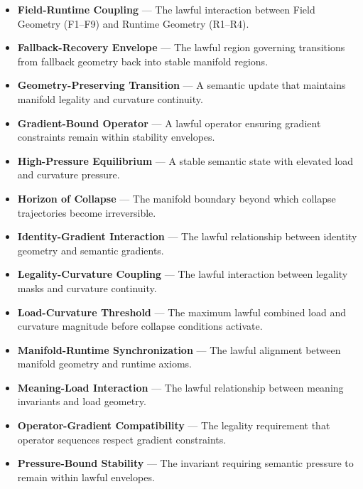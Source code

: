 \begin{itemize}
    \item \textbf{Field-Runtime Coupling} — The lawful interaction between Field Geometry (F1–F9) and Runtime Geometry (R1–R4).

    \item \textbf{Fallback-Recovery Envelope} — The lawful region governing transitions from fallback geometry back into stable manifold regions.

    \item \textbf{Geometry-Preserving Transition} — A semantic update that maintains manifold legality and curvature continuity.

    \item \textbf{Gradient-Bound Operator} — A lawful operator ensuring gradient constraints remain within stability envelopes.

    \item \textbf{High-Pressure Equilibrium} — A stable semantic state with elevated load and curvature pressure.

    \item \textbf{Horizon of Collapse} — The manifold boundary beyond which collapse trajectories become irreversible.

    \item \textbf{Identity-Gradient Interaction} — The lawful relationship between identity geometry and semantic gradients.

    \item \textbf{Legality-Curvature Coupling} — The lawful interaction between legality masks and curvature continuity.

    \item \textbf{Load-Curvature Threshold} — The maximum lawful combined load and curvature magnitude before collapse conditions activate.

    \item \textbf{Manifold-Runtime Synchronization} — The lawful alignment between manifold geometry and runtime axioms.

    \item \textbf{Meaning-Load Interaction} — The lawful relationship between meaning invariants and load geometry.

    \item \textbf{Operator-Gradient Compatibility} — The legality requirement that operator sequences respect gradient constraints.

    \item \textbf{Pressure-Bound Stability} — The invariant requiring semantic pressure to remain within lawful envelopes.


\end{itemize}
